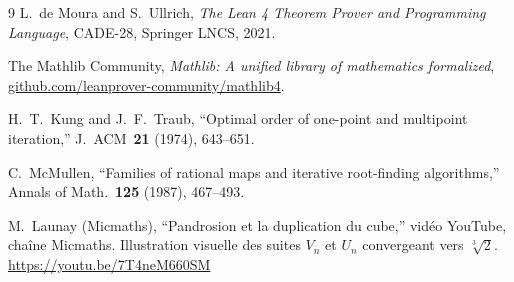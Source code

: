 \documentclass[11pt,a4paper]{article}
\theoremstyle{definition}
\begin{document}
\begin{thebibliography}{9}
L.~de Moura and S.~Ullrich,
\textit{The Lean 4 Theorem Prover and Programming Language},
CADE-28, Springer LNCS, 2021.

The Mathlib Community,
\textit{Mathlib: A unified library of mathematics formalized},
\url{github.com/leanprover-community/mathlib4}.

H.~T.~Kung and J.~F.~Traub,
``Optimal order of one-point and multipoint iteration,''
J.~ACM~\textbf{21} (1974), 643--651.

C.~McMullen,
``Families of rational maps and iterative root-finding algorithms,''
Annals of Math.~\textbf{125} (1987), 467--493.

M.~Launay (Micmaths),
``Pandrosion et la duplication du cube,''
vid\'eo YouTube, cha\^ine Micmaths.
Illustration visuelle des suites $V_n$ et $U_n$ convergeant vers $\sqrt[3]{2}$.
\url{https://youtu.be/7T4neM660SM}

\end{thebibliography}
\end{document}
